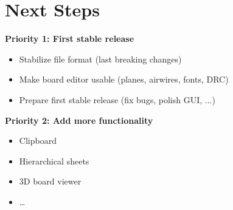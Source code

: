 \section{Next Steps}

\begin{frame}{\secname}
  \textbf{Priority 1: First stable release}
  \begin{itemize}
    \item Stabilize file format (last breaking changes)
    \item Make board editor usable (planes, airwires, fonts, DRC)
    \item Prepare first stable release (fix bugs, polish GUI, ...)
  \end{itemize}
  
  \vfill
  \pause
  
  \textbf{Priority 2: Add more functionality}
  \begin{itemize}
    \item Clipboard \faCut\ \faCopy\ \faPaste\
    \item Hierarchical sheets
    \item 3D board viewer
    \item \dots
  \end{itemize}
\end{frame}